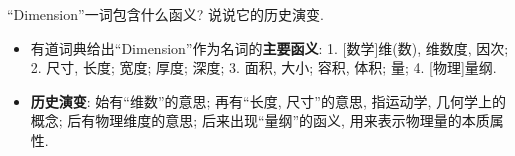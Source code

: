 \begin{problem}[02]
``Dimension''一词包含什么函义? 说说它的历史演变.
\end{problem}
\begin{solution}
\begin{itemize}
\item 有道词典给出``Dimension''作为名词的\textbf{主要函义}\cite{youdao_dimension}: 1. [数学]维(数), 维数度, 因次; 2. 尺寸, 长度; 宽度; 厚度; 深度; 3. 面积, 大小; 容积, 体积; 量; 4. [物理]量纲.
\item \textbf{历史演变}: 始有``维数''的意思; 再有``长度, 尺寸''的意思, 指运动学, 几何学上的概念; 后有物理维度的意思;  后来出现``量纲''的函义, 用来表示物理量的本质属性.
\end{itemize}
\end{solution}
